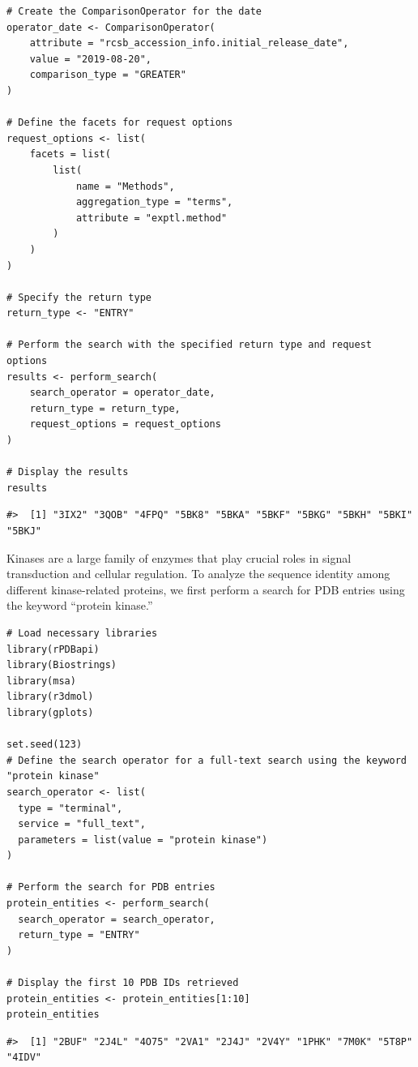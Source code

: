 \begin{verbatim}
# Create the ComparisonOperator for the date
operator_date <- ComparisonOperator(
    attribute = "rcsb_accession_info.initial_release_date",
    value = "2019-08-20",
    comparison_type = "GREATER"
)

# Define the facets for request options
request_options <- list(
    facets = list(
        list(
            name = "Methods",
            aggregation_type = "terms",
            attribute = "exptl.method"
        )
    )
)

# Specify the return type
return_type <- "ENTRY"

# Perform the search with the specified return type and request options
results <- perform_search(
    search_operator = operator_date,
    return_type = return_type,
    request_options = request_options
)

# Display the results
results
\end{verbatim}

\begin{verbatim}
#>  [1] "3IX2" "3QOB" "4FPQ" "5BK8" "5BKA" "5BKF" "5BKG" "5BKH" "5BKI" "5BKJ"
\end{verbatim}

Kinases are a large family of enzymes that play crucial roles in signal transduction and cellular regulation. To analyze the sequence identity among different kinase-related proteins, we first perform a search for PDB entries using the keyword ``protein kinase.''

\begin{verbatim}
# Load necessary libraries
library(rPDBapi)
library(Biostrings)
library(msa)
library(r3dmol)
library(gplots)

set.seed(123)
# Define the search operator for a full-text search using the keyword "protein kinase"
search_operator <- list(
  type = "terminal",
  service = "full_text",
  parameters = list(value = "protein kinase")
)

# Perform the search for PDB entries
protein_entities <- perform_search(
  search_operator = search_operator,
  return_type = "ENTRY"
)

# Display the first 10 PDB IDs retrieved
protein_entities <- protein_entities[1:10]
protein_entities
\end{verbatim}

\begin{verbatim}
#>  [1] "2BUF" "2J4L" "4O75" "2VA1" "2J4J" "2V4Y" "1PHK" "7M0K" "5T8P" "4IDV"
\end{verbatim}

